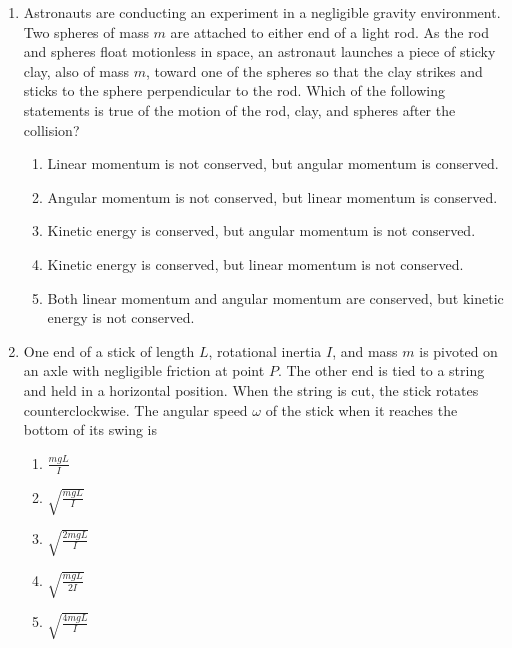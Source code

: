 \documentclass{../../../oss-apphys}
\begin{document}
\begin{multicols}{2}
\begin{enumerate}[leftmargin=18pt]
    
  \item Astronauts are conducting an experiment in a negligible gravity
    environment. Two spheres of mass $m$ are attached to either end of a light
    rod. As the rod and spheres float motionless in space, an astronaut
    launches a piece of sticky clay, also of mass $m$, toward one of the spheres
    so that the clay strikes and sticks to the sphere perpendicular to the rod.
    Which of the following statements is true of the motion of the rod, clay,
    and spheres after the collision?
    \begin{center}
    \end{center}
    \begin{enumerate}[noitemsep,topsep=0pt,leftmargin=18pt,label=(\Alph*)]
    \item Linear momentum is not conserved, but angular momentum is conserved.
    \item Angular momentum is not conserved, but linear momentum is conserved.
    \item Kinetic energy is conserved, but angular momentum is not conserved.
    \item Kinetic energy is conserved, but linear momentum is not conserved.
    \item Both linear momentum and angular momentum are conserved, but kinetic
      energy is not conserved.
    \end{enumerate}
    \columnbreak
    
  \item One end of a stick of length $L$, rotational inertia $I$, and mass $m$
    is pivoted on an axle with negligible friction at point $P$. The other end
    is tied to a string and held in a horizontal position. When the string is
    cut, the stick rotates counterclockwise. The angular speed $\omega$ of the
    stick when it reaches the bottom of its swing is
    \begin{center}
    \end{center}
    \begin{enumerate}[noitemsep,topsep=0pt,leftmargin=18pt,label=(\Alph*)]
    \item$\displaystyle\frac{mgL}{I}$
    \item$\displaystyle\sqrt{\frac{mgL}{I}}$
    \item$\displaystyle\sqrt{\frac{2mgL}{I}}$
    \item$\displaystyle\sqrt{\frac{mgL}{2I}}$
    \item$\displaystyle\sqrt{\frac{4mgL}{I}}$
    \end{enumerate}


\end{enumerate}
\end{multicols}
\end{document}
